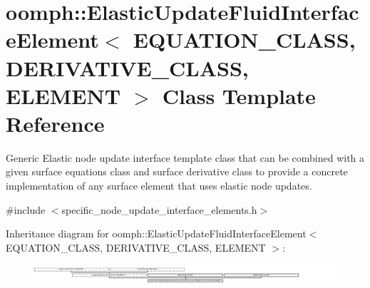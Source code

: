 \hypertarget{classoomph_1_1ElasticUpdateFluidInterfaceElement}{}\section{oomph\+:\+:Elastic\+Update\+Fluid\+Interface\+Element$<$ E\+Q\+U\+A\+T\+I\+O\+N\+\_\+\+C\+L\+A\+SS, D\+E\+R\+I\+V\+A\+T\+I\+V\+E\+\_\+\+C\+L\+A\+SS, E\+L\+E\+M\+E\+NT $>$ Class Template Reference}
\label{classoomph_1_1ElasticUpdateFluidInterfaceElement}


Generic Elastic node update interface template class that can be combined with a given surface equations class and surface derivative class to provide a concrete implementation of any surface element that uses elastic node updates.  




{\ttfamily \#include $<$specific\+\_\+node\+\_\+update\+\_\+interface\+\_\+elements.\+h$>$}

Inheritance diagram for oomph\+:\+:Elastic\+Update\+Fluid\+Interface\+Element$<$ E\+Q\+U\+A\+T\+I\+O\+N\+\_\+\+C\+L\+A\+SS, D\+E\+R\+I\+V\+A\+T\+I\+V\+E\+\_\+\+C\+L\+A\+SS, E\+L\+E\+M\+E\+NT $>$\+:\begin{figure}[H]
\begin{center}
\leavevmode
\includegraphics[height=0.707071cm]{classoomph_1_1ElasticUpdateFluidInterfaceElement}
\end{center}
\end{figure}
